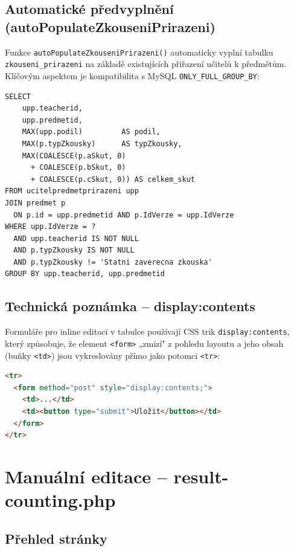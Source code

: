\documentclass[12pt,a4paper]{report}
\begin{document}
\section{Automatické předvyplnění (autoPopulateZkouseniPrirazeni)}

Funkce \texttt{autoPopulateZkouseniPrirazeni()} automaticky vyplní tabulku \texttt{zkouseni\_prirazeni} na základě existujících přiřazení učitelů k předmětům. Klíčovým aspektem je kompatibilita s MySQL \texttt{ONLY\_FULL\_GROUP\_BY}:

\begin{lstlisting}[style=sqlstyle, caption={GROUP BY kompatibilní dotaz pro autoPopulateZkouseniPrirazeni}]
SELECT
    upp.teacherid,
    upp.predmetid,
    MAX(upp.podil)         AS podil,
    MAX(p.typZkousky)      AS typZkousky,
    MAX(COALESCE(p.aSkut, 0)
      + COALESCE(p.bSkut, 0)
      + COALESCE(p.cSkut, 0)) AS celkem_skut
FROM ucitelpredmetprirazeni upp
JOIN predmet p
  ON p.id = upp.predmetid AND p.IdVerze = upp.IdVerze
WHERE upp.IdVerze = ?
  AND upp.teacherid IS NOT NULL
  AND p.typZkousky IS NOT NULL
  AND p.typZkousky != 'Statni zaverecna zkouska'
GROUP BY upp.teacherid, upp.predmetid
\end{lstlisting}

\section{Technická poznámka -- display:contents}

Formuláře pro inline editaci v tabulce používají CSS trik \texttt{display:contents}, který způsobuje, že element \texttt{<form>} „zmizí" z pohledu layoutu a jeho obsah (buňky \texttt{<td>}) jsou vykreslovány přímo jako potomci \texttt{<tr>}:

\begin{lstlisting}[language=HTML, caption={CSS trik pro formuláře uvnitř tabulky}]
<tr>
  <form method="post" style="display:contents;">
    <td>...</td>
    <td><button type="submit">Uložit</button></td>
  </form>
</tr>
\end{lstlisting}

\chapter{Manuální editace -- result-counting.php}

\section{Přehled stránky}
\end{document}
